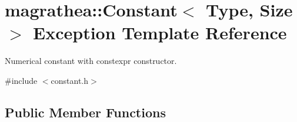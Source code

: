 \hypertarget{exceptionmagrathea_1_1Constant}{\section{magrathea\-:\-:Constant$<$ Type, Size $>$ Exception Template Reference}
\label{exceptionmagrathea_1_1Constant}
}


Numerical constant with constexpr constructor.  




{\ttfamily \#include $<$constant.\-h$>$}

\subsection*{Public Member Functions}
